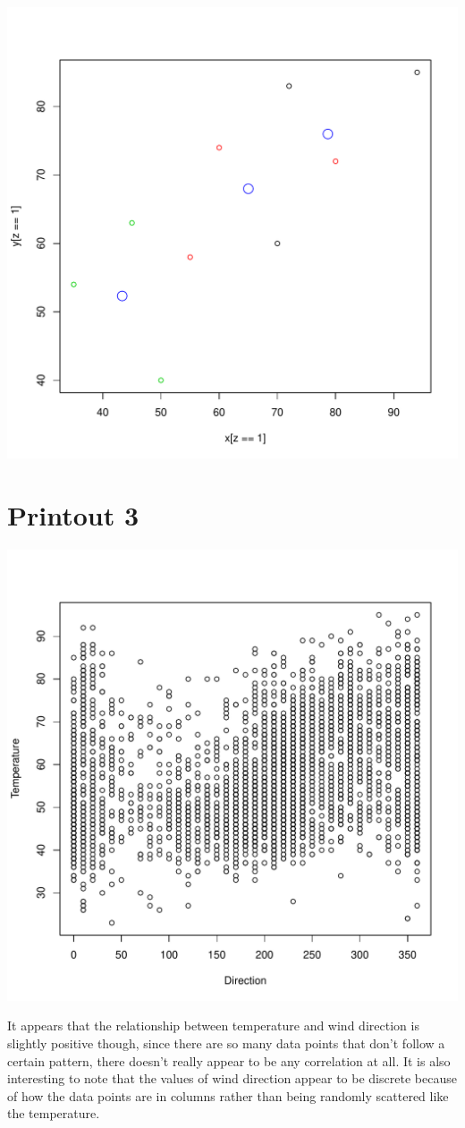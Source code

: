 \documentclass{article}
\begin{document}
	\includegraphics[page=1]{img/Lab3_2.pdf} 

\section*{Printout 3}

	\includegraphics[page=1]{img/Lab3_3.pdf} 

	It appears that the relationship between temperature and wind direction is slightly positive 
	though, since there are so many data points that don't follow a certain pattern, there doesn't 
	really appear to be any correlation at all. It is also interesting to note that the values of wind 
	direction appear to be discrete because of how the data points are in columns rather than being 
	randomly scattered like the temperature.
\end{document}
